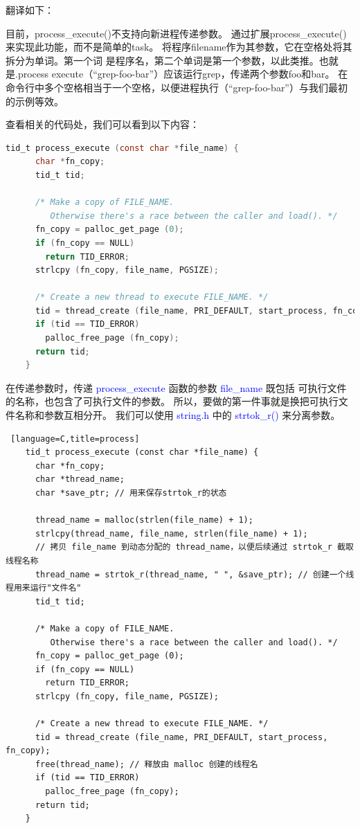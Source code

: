 \documentclass[14pt,a4paper,UTF8,twoside]{article}
\renewcommand{\texttt}[1]{\textcolor{blue}{\ttfamily #1}}
\begin{document}
\begin{mdframed}
    翻译如下：
    
    目前，process\_execute()不支持向新进程传递参数。
通过扩展process\_execute()来实现此功能，而不是简单的task。
将程序filename作为其参数，它在空格处将其拆分为单词。第一个词
是程序名，第二个单词是第一个参数，以此类推。也就是.process
execute（“grep-foo-bar”）应该运行grep，传递两个参数foo和bar。
在命令行中多个空格相当于一个空格，以便进程执行（“grep-foo-bar”）与我们最初的示例等效。
\end{mdframed}

查看相关的代码处，我们可以看到以下内容：

\begin{lstlisting}[language=C,title=process]
    tid_t process_execute (const char *file_name) {
      char *fn_copy;
      tid_t tid;
    
      /* Make a copy of FILE_NAME.
         Otherwise there's a race between the caller and load(). */
      fn_copy = palloc_get_page (0);
      if (fn_copy == NULL)
        return TID_ERROR;
      strlcpy (fn_copy, file_name, PGSIZE);
    
      /* Create a new thread to execute FILE_NAME. */
      tid = thread_create (file_name, PRI_DEFAULT, start_process, fn_copy);
      if (tid == TID_ERROR)
        palloc_free_page (fn_copy); 
      return tid;
    }
\end{lstlisting}

\begin{ctt}
在传递参数时，传递 \texttt{process\_execute} 函数的参数 \texttt{file\_name} 既包括
可执行文件的名称，也包含了可执行文件的参数。
所以，要做的第一件事就是换把可执行文件名称和参数互相分开。
我们可以使用 \texttt{string.h} 中的 \texttt{strtok\_r()} 来分离参数。
\end{ctt}

\begin{lstlisting} [language=C,title=process]
    tid_t process_execute (const char *file_name) {
      char *fn_copy;
      char *thread_name;
      char *save_ptr; // 用来保存strtok_r的状态
    
      thread_name = malloc(strlen(file_name) + 1);
      strlcpy(thread_name, file_name, strlen(file_name) + 1);
      // 拷贝 file_name 到动态分配的 thread_name，以便后续通过 strtok_r 截取线程名称
      thread_name = strtok_r(thread_name, " ", &save_ptr); // 创建一个线程用来运行"文件名"
      tid_t tid;
    
      /* Make a copy of FILE_NAME.
         Otherwise there's a race between the caller and load(). */
      fn_copy = palloc_get_page (0);
      if (fn_copy == NULL)
        return TID_ERROR;
      strlcpy (fn_copy, file_name, PGSIZE);
    
      /* Create a new thread to execute FILE_NAME. */
      tid = thread_create (file_name, PRI_DEFAULT, start_process, fn_copy);
      free(thread_name); // 释放由 malloc 创建的线程名
      if (tid == TID_ERROR)
        palloc_free_page (fn_copy); 
      return tid;
    }
\end{lstlisting}
\end{document}
